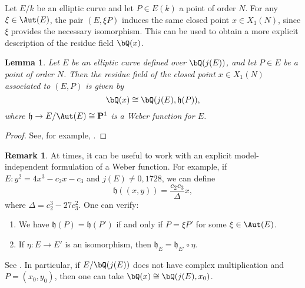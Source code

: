 \documentclass[11pt,reqno]{amsart}
\theoremstyle{plain}
\newtheorem{lemma}[theorem]{Lemma}
\theoremstyle{definition}
\newtheorem{remark}[theorem]{Remark}
\newcommand{\Q}{\bQ}
\newcommand{\abbey}[1]{\textcolor{blue}{Abbey: #1}}
\begin{document}
Let $E/k$ be an elliptic curve and let $P \in E(k)$ a point of order $N$.
For any $\xi \in \Aut(E)$, the pair $(E,\xi P)$ induces the same closed point $x \in X_1(N)$, since $\xi$ provides the necessary isomorphism. This can be used to obtain a more explicit description of the residue field $\Q(x)$.

\begin{lemma}\label{ResidueFieldLemma}
Let $E$ be an elliptic curve defined over $\Q(j(E))$, and let $P \in E$ be a point of order $N$. Then the residue field of the closed point $x \in X_1(N)$ associated to $(E,P)$ is given by
\[
\Q(x)\cong\Q(j(E),\mathfrak{h}(P)),
\]
where $\mathfrak{h} \rightarrow E/\Aut(E) \cong \mathbf{P}^1$ is a Weber function for $E$.
\end{lemma}

\begin{proof}
See, for example, \cite[Lemma 2.5]{BourdonNajman2021}.%
\end{proof}


 \begin{remark}\label{ResidueFieldRmk}At times, it can be useful to work with an explicit model-independent formulation of a Weber function. For example, if $E:y^2=4x^3-c_2x-c_3$ and $j(E)\neq 0,1728$, we can define
\[
\mathfrak{h}((x,y))=\frac{c_2c_3}{\Delta}x,
\]
where $\Delta=c_2^3-27c_3^2$. One can verify:
\begin{enumerate}
    \item We have $\mathfrak{h}(P)=\mathfrak{h}(P')$ if and only if $P=\xi P'$ for some $\xi \in \Aut(E)$.
    \item If $\eta \colon E \rightarrow E'$ is an isomorphism, then $\mathfrak{h}_E=\mathfrak{h}_{E'}\circ \eta$.
\end{enumerate}
See \cite[p. 107]{shimura}. In particular, if $E/\Q(j(E))$ does not have complex multiplication and $P=(x_0,y_0)$, then one can take $\Q(x)\cong\Q(j(E),x_0)$. 
\end{remark}
\end{document}
